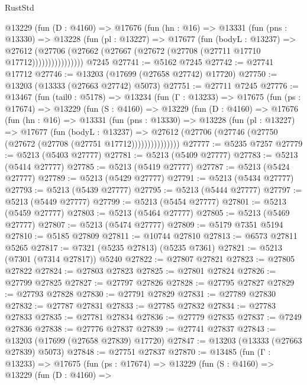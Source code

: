 \begin{lexlean}{RustStd}
\begin{coremodule}
            @13229
              (fun (D : @4160) =>
              @17676
                (fun (hn : @16) =>
                @13331
                  (fun (pns : @13330) =>
                  @13228
                    (fun (pl : @13227) =>
                    @17677
                      (fun (bodyL : @13237) =>
                      @27612
                        (@27706
                          (@27662 (@27667 (@27672 (@27708 (@27711 @17710 @17712))))))))))))))))
    @7245
@27741 := @5162 @7245
@27742 := @27741 @17712
@27746 := @13203 (@17699 (@27658 @27742) @17720)
@27750 := @13203 (@13333 (@27663 @27742) @5073)
@27751 := @27711 @7245
@27776 := @13467
    (fun (tail0 : @5178) =>
    @13234
      (fun (Γ : @13233) =>
      @17675
        (fun (ps : @17674) =>
        @13229
          (fun (S : @4160) =>
          @13229
            (fun (D : @4160) =>
            @17676
              (fun (hn : @16) =>
              @13331
                (fun (pns : @13330) =>
                @13228
                  (fun (pl : @13227) =>
                  @17677
                    (fun (bodyL : @13237) =>
                    @27612 (@27706 (@27746 (@27750 (@27672 (@27708 (@27751 @17712)))))))))))))))
@27777 := @5235 @7257
@27779 := @5213 (@5403 @27777)
@27781 := @5213 (@5409 @27777)
@27783 := @5213 (@5414 @27777)
@27785 := @5213 (@5419 @27777)
@27787 := @5213 (@5424 @27777)
@27789 := @5213 (@5429 @27777)
@27791 := @5213 (@5434 @27777)
@27793 := @5213 (@5439 @27777)
@27795 := @5213 (@5444 @27777)
@27797 := @5213 (@5449 @27777)
@27799 := @5213 (@5454 @27777)
@27801 := @5213 (@5459 @27777)
@27803 := @5213 (@5464 @27777)
@27805 := @5213 (@5469 @27777)
@27807 := @5213 (@5474 @27777)
@27809 := @5179 @7351 @5194
@27810 := @5185 @27809
@27811 := @10744 @27810
@27813 := @6573 @27811 @5265
@27817 := @7321 (@5235 @27813) (@5235 @7361)
@27821 := @5213 (@7301 (@7314 @27817)) @5240
@27822 := @27807 @27821
@27823 := @27805 @27822
@27824 := @27803 @27823
@27825 := @27801 @27824
@27826 := @27799 @27825
@27827 := @27797 @27826
@27828 := @27795 @27827
@27829 := @27793 @27828
@27830 := @27791 @27829
@27831 := @27789 @27830
@27832 := @27787 @27831
@27833 := @27785 @27832
@27834 := @27783 @27833
@27835 := @27781 @27834
@27836 := @27779 @27835
@27837 := @7249 @27836
@27838 := @27776 @27837
@27839 := @27741 @27837
@27843 := @13203 (@17699 (@27658 @27839) @17720)
@27847 := @13203 (@13333 (@27663 @27839) @5073)
@27848 := @27751 @27837
@27870 := @13485
    (fun (Γ : @13233) =>
    @17675
      (fun (ps : @17674) =>
      @13229
        (fun (S : @4160) =>
        @13229
          (fun (D : @4160) =>

\end{coremodule}
\end{lexlean}
